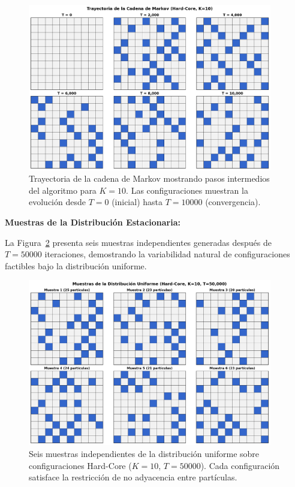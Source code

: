 \begin{figure}[htbp]
\centering
\includegraphics[width=0.95\textwidth]{img/figuras/trayectoria_cadena.png}
\caption{Trayectoria de la cadena de Markov mostrando pasos intermedios del algoritmo para $K=10$. Las configuraciones muestran la evolución desde $T=0$ (inicial) hasta $T=10000$ (convergencia).}
\label{fig:trayectoria_hc}
\end{figure}

\textbf{Muestras de la Distribución Estacionaria:}

La Figura~\ref{fig:multiples_hc} presenta seis muestras independientes generadas después de $T=50000$ iteraciones, demostrando la variabilidad natural de configuraciones factibles bajo la distribución uniforme.

\begin{figure}[htbp]
\centering
\includegraphics[width=0.95\textwidth]{img/figuras/multiples_muestras_hc.png}
\caption{Seis muestras independientes de la distribución uniforme sobre configuraciones Hard-Core ($K=10$, $T=50000$). Cada configuración satisface la restricción de no adyacencia entre partículas.}
\label{fig:multiples_hc}
\end{figure}

